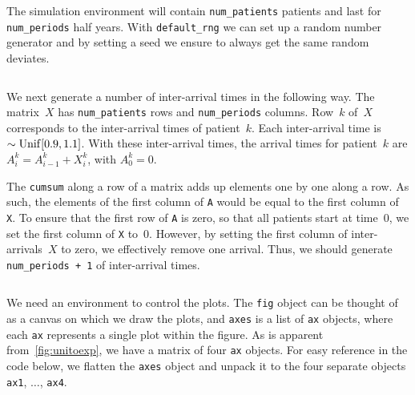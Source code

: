 \documentclass[stochastic-or.tex]{subfiles}
\begin{document}
The simulation environment will contain \texttt{num_patients} patients and last for \texttt{num_periods} half years.
With \texttt{default_rng} we can set up a random number generator and by setting a seed
we  ensure to always get the same random deviates.
\inputminted[firstline=29, lastline=31]{python}{../code/IBD_simulations.py} %

We next generate a number of inter-arrival times in the following way.
The matrix~$X$ has \texttt{num_patients} rows and \texttt{num_periods} columns.
Row~$k$ of~$X$ corresponds to the inter-arrival times of patient~$k$.
Each inter-arrival time is $\sim\mathrm{Unif}[0.9, 1.1]$.
With these inter-arrival times, the arrival times for patient~$k$ are $A_{i}^{k} = A_{i-1}^{k} + X_{i}^{k}$, with $A_0^{k}=0$.

The \texttt{cumsum} along a row of a matrix adds up elements one by one along a row.
As such, the elements of the first column of \texttt{A} would be equal to the first column of \texttt{X}.
To ensure that the first row of \texttt{A} is zero, so that all patients start at time~$0$, we set the first column of \texttt{X} to~$0$.
However, by setting the first column of inter-arrivals~$X$ to zero, we effectively remove one arrival.
Thus, we should generate \texttt{num_periods + 1} of inter-arrival times.

\inputminted[firstline=35, lastline=37]{python}{../code/IBD_simulations.py} %


We need an environment to control the plots.
The \texttt{fig} object can be thought of as a canvas on which we draw the plots, and \texttt{axes} is a list of \texttt{ax} objects, where each \texttt{ax} represents a single plot within the figure.
As is apparent from~\cref{fig:unitoexp}, we have a matrix of four \texttt{ax} objects.
For easy reference in the code below, we flatten
the \texttt{axes} object and unpack it to the four separate objects \texttt{ax1}, $\ldots$, \texttt{ax4}.
\inputminted[firstline=42, lastline=43]{python}{../code/IBD_simulations.py} %
\end{document}

